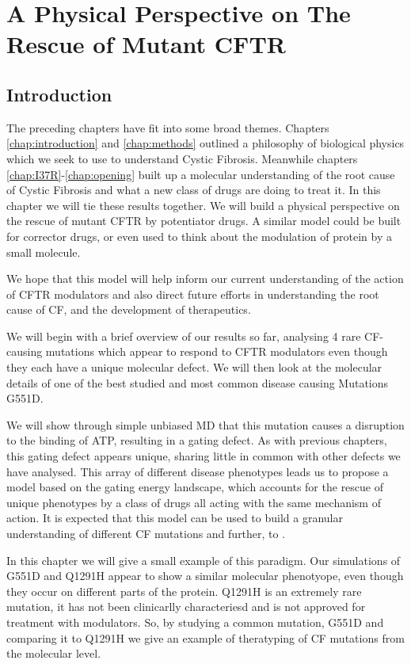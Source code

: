 \chapter{A Physical Perspective on The Rescue of Mutant CFTR}
\label{chap:perspective}

\section{Introduction}

The preceding chapters have fit into some broad themes. Chapters \ref{chap:introduction} and \ref{chap:methods} outlined a philosophy of biological physics which we seek to use to understand Cystic Fibrosis. Meanwhile chapters \ref{chap:I37R}-\ref{chap:opening} built up a molecular understanding of the root cause of Cystic Fibrosis and what a new class of drugs are doing to treat it. In this chapter we will tie these results together. We will build a physical perspective on the rescue of mutant CFTR by potentiator drugs. A similar model could be built for corrector drugs, or even used to think about the modulation of protein by a small molecule.

We hope that this model will help inform our current understanding of the action of CFTR modulators and also direct future efforts in understanding the root cause of CF, and the development of therapeutics.

We will begin with a brief overview of our results so far, analysing 4 rare CF-causing mutations which appear to respond to CFTR modulators even though they each have a unique molecular defect. We will then look at the molecular details of one of the best studied and most common disease causing Mutations G551D. 

We will show through simple unbiased MD that this mutation causes a disruption to the binding of ATP, resulting in a gating defect. As with previous chapters, this gating defect appears unique, sharing little in common with other defects we have analysed. This array of different disease phenotypes leads us to propose a model based on the gating energy landscape, which accounts for the rescue of unique phenotypes by a class of drugs all acting with the same mechanism of action. It is expected that this model can be used to build a granular understanding of different CF mutations and further, to .

In this chapter we will give a small example of this paradigm. Our simulations of G551D and Q1291H appear to show a similar molecular phenotyope, even though they occur on different parts of the protein. Q1291H is an extremely rare mutation, it has not been clinicarlly characteriesd and is not approved for treatment with modulators. So, by studying a common mutation, G551D and comparing it to Q1291H we give an example of theratyping of CF mutations from the molecular level.

